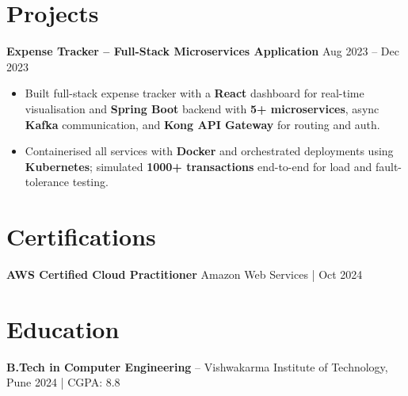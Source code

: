 \documentclass[letterpaper,10pt]{article}
\begin{document}
\section*{Projects}

\textbf{Expense Tracker -- Full-Stack Microservices Application} \hfill Aug 2023 -- Dec 2023
\begin{itemize}[leftmargin=*]
    \item Built full-stack expense tracker with a \textbf{React} dashboard for real-time visualisation and \textbf{Spring Boot} backend with \textbf{5+ microservices}, async \textbf{Kafka} communication, and \textbf{Kong API Gateway} for routing and auth.
    \item Containerised all services with \textbf{Docker} and orchestrated deployments using \textbf{Kubernetes}; simulated \textbf{1000+ transactions} end-to-end for load and fault-tolerance testing.
\end{itemize}

\section*{Certifications}
\textbf{AWS Certified Cloud Practitioner} \hfill Amazon Web Services \;|\; Oct 2024

\section*{Education}
\textbf{B.Tech in Computer Engineering} -- Vishwakarma Institute of Technology, Pune \hfill 2024 \;|\; CGPA: 8.8
\end{document}
